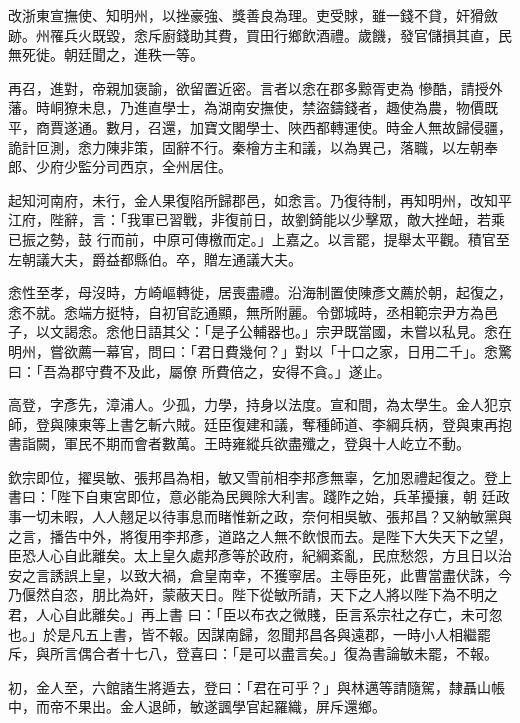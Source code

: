 \begin{pinyinscope}
 改浙東宣撫使、知明州，以挫豪強、獎善良為理。吏受賕，雖一錢不貸，奸猾斂跡。州罹兵火既毀，悆斥廚錢助其費，買田行鄉飲酒禮。歲饑，發官儲損其直，民無死徙。朝廷聞之，進秩一等。



 再召，進對，帝親加褒諭，欲留置近密。言者以悆在郡多黥胥吏為
 慘酷，請授外藩。時峒獠未息，乃進直學士，為湖南安撫使，禁盜鑄錢者，趣使為農，物價既平，商賈遂通。數月，召還，加寶文閣學士、陜西都轉運使。時金人無故歸侵疆，詭計叵測，悆力陳非策，固辭不行。秦檜方主和議，以為異己，落職，以左朝奉郎、少府少監分司西京，全州居住。



 起知河南府，未行，金人果復陷所歸郡邑，如悆言。乃復待制，再知明州，改知平江府，陛辭，言：「我軍已習戰，非復前日，故劉錡能以少擊眾，敵大挫衄，若乘已振之勢，鼓
 行而前，中原可傳檄而定。」上嘉之。以言罷，提舉太平觀。積官至左朝議大夫，爵益都縣伯。卒，贈左通議大夫。



 悆性至孝，母沒時，方崎嶇轉徙，居喪盡禮。沿海制置使陳彥文薦於朝，起復之，悆不就。悆端方挺特，自初官訖通顯，無所附麗。令鄧城時，丞相範宗尹方為邑子，以文謁悆。悆他日語其父：「是子公輔器也。」宗尹既當國，未嘗以私見。悆在明州，嘗欲薦一幕官，問曰：「君日費幾何？」對以「十口之家，日用二千」。悆驚曰：「吾為郡守費不及此，屬僚
 所費倍之，安得不貪。」遂止。



 高登，字彥先，漳浦人。少孤，力學，持身以法度。宣和間，為太學生。金人犯京師，登與陳東等上書乞斬六賊。廷臣復建和議，奪種師道、李綱兵柄，登與東再抱書詣闕，軍民不期而會者數萬。王時雍縱兵欲盡殲之，登與十人屹立不動。



 欽宗即位，擢吳敏、張邦昌為相，敏又雪前相李邦彥無辜，乞加恩禮起復之。登上書曰：「陛下自東宮即位，意必能為民興除大利害。踐阼之始，兵革擾攘，朝
 廷政事一切未暇，人人翹足以待事息而睹惟新之政，奈何相吳敏、張邦昌？又納敏黨與之言，播告中外，將復用李邦彥，道路之人無不飲恨而去。是陛下大失天下之望，臣恐人心自此離矣。太上皇久處邦彥等於政府，紀綱紊亂，民庶愁怨，方且日以治安之言誘誤上皇，以致大禍，倉皇南幸，不獲寧居。主辱臣死，此曹當盡伏誅，今乃偃然自恣，朋比為奸，蒙蔽天日。陛下從敏所請，天下之人將以陛下為不明之君，人心自此離矣。」再上書
 曰：「臣以布衣之微賤，臣言系宗社之存亡，未可忽也。」於是凡五上書，皆不報。因謀南歸，忽聞邦昌各與遠郡，一時小人相繼罷斥，與所言偶合者十七八，登喜曰：「是可以盡言矣。」復為書論敏未罷，不報。



 初，金人至，六館諸生將遁去，登曰：「君在可乎？」與林邁等請隨駕，隸聶山帳中，而帝不果出。金人退師，敏遂諷學官起羅織，屏斥還鄉。




\end{pinyinscope}
